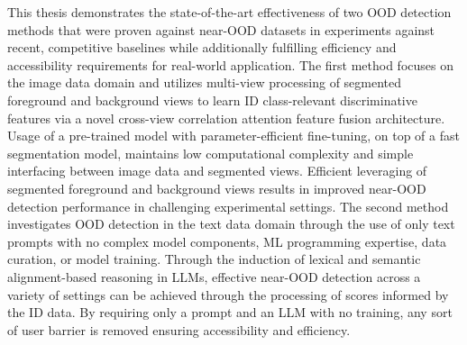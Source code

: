 This thesis demonstrates the state-of-the-art effectiveness of two OOD detection methods that were proven against near-OOD datasets in experiments against recent, competitive baselines while additionally fulfilling efficiency and accessibility requirements for real-world application. The first method focuses on the image data domain and utilizes multi-view processing of segmented foreground and background views to learn ID class-relevant discriminative features via a novel cross-view correlation attention feature fusion architecture. Usage of a pre-trained model with parameter-efficient fine-tuning, on top of a fast segmentation model, maintains low computational complexity and simple interfacing between image data and segmented views. Efficient leveraging of segmented foreground and background views results in improved near-OOD detection performance in challenging experimental settings. The second method investigates OOD detection in the text data domain through the use of only text prompts with no complex model components, ML programming expertise, data curation, or model training. Through the induction of lexical and semantic alignment-based reasoning in LLMs, effective near-OOD detection across a variety of settings can be achieved through the processing of scores informed by the ID data. By requiring only a prompt and an LLM with no training, any sort of user barrier is removed ensuring accessibility and efficiency.